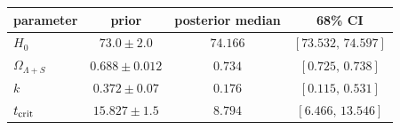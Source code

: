\begin{tabular}{lccc}
\toprule
parameter & prior & posterior median & 68\% CI \\
\midrule
$H_0$ & $73.0 \pm 2.0$ & $74.166$ & $[73.532,\,74.597]$ \\
$\Omega_{\Lambda+S}$ & $0.688 \pm 0.012$ & $0.734$ & $[0.725,\,0.738]$ \\
$k$ & $0.372 \pm 0.07$ & $0.176$ & $[0.115,\,0.531]$ \\
$t_{\rm crit}$ & $15.827 \pm 1.5$ & $8.794$ & $[6.466,\,13.546]$ \\
\bottomrule
\end{tabular}
